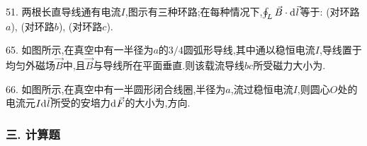 51. 两根长直导线通有电流$I$,图示有三种环路;在每种情况下,$\oint_L\vec B\cdot{\mathrm{d}\:\!}\vec l$等于:
    (对环路$a$),
    (对环路$b$),
    (对环路$c$).

65. 如图所示,在真空中有一半径为$a$的$3/4$圆弧形导线,其中通以稳恒电流$I$,导线置于均匀外磁场$\vec B$中,且$\vec B$与导线所在平面垂直.则该载流导线${bc}$所受磁力大小为.

66. 如图所示,在真空中有一半圆形闭合线圈,半径为$a$,流过稳恒电流$I$,则圆心$O$处的电流元$I{\mathrm{d}\:\!}\vec l$所受的安培力${\mathrm{d}\:\!}\vec F$的大小为,方向.

\subsubsection*{三. 计算题}

